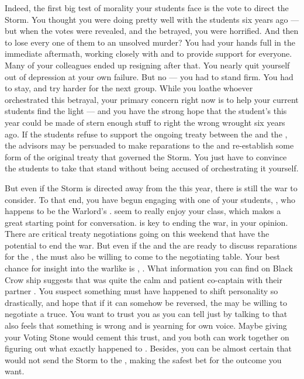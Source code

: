 \documentclass[char]{GL2020}
\begin{document}
Indeed, the first big test of morality your students face is the vote to direct the Storm. You thought you were doing pretty well with the students six years ago — but when the votes were revealed, and the \pShip{} betrayed, you were horrified. And then to lose every one of them to an unsolved murder? You had your hands full in the immediate aftermath, working closely with \cFlowPriest{\full} and \cMusic{\full} to provide support for everyone. Many of your colleagues ended up resigning after that. You nearly quit yourself out of depression at your own failure. But no — you had to stand firm. You had to stay, and try harder for the next group. While you loathe whoever orchestrated this betrayal, your primary concern right now is to help your current students find the light — and you have the strong hope that the student's this year could be made of stern enough stuff to right the wrong wrought six years ago. If the students refuse to support the ongoing treaty between the \pFarm{} and the \pTech{}, the advisors may be persuaded to make reparations to the \pShip{} and re-establish some form of the original treaty that governed the Storm. You just have to convince the students to take that stand without being accused of orchestrating it yourself.

But even if the Storm is directed away from the \pShip{} this year, there is still the war to consider. To that end, you have begun engaging with one of your \pShippie{} students, \cWarlordDaughter{\full}, who happens to be the Warlord's \cWarlordDaughter{\offspring}. \cWarlordDaughter{\They} seem\cWarlordDaughter{\verbs} to really enjoy your class, which makes a great starting point for conversation. \cWarlordDaughter{} is key to ending the war, in your opinion. There are critical treaty negotiations going on this weekend that have the potential to end the war. But even if the \pFarm{} and the \pTech{} are ready to discuss reparations for the \pShippies{}, the \pShip{} must also be willing to come to the negotiating table. Your best chance for insight into the warlike \cLoud{\full} is \cLoud{\their} \cWarlordDaughter{\offspring}, \cWarlordDaughter{}. What information you can find on Black Crow ship suggests that \cLoud{} was quite the calm and patient co-captain with their partner \cQuiet{\full}. You suspect something must have happened to shift \cLoud{\their} personality so drastically, and hope that if it can somehow be reversed, the \pShip{} may be willing to negotiate a truce. You want \cWarlordDaughter{} to trust you as you can tell just by talking to \cWarlordDaughter{\them} that \cWarlordDaughter{\they} also feels that something is wrong and is yearning for  own voice. Maybe giving \cWarlordDaughter{} your Voting Stone would cement this trust, and you both can work together on figuring out what exactly happened to \cLoud. Besides, you can be almost certain that \cWarlordDaughter{} would not send the Storm to the \pShip{}, making \cWarlordDaughter{} the safest bet for the outcome you want.  
\end{document}
